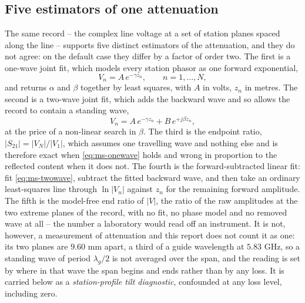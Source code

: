 \subsection{Five estimators of one attenuation}
\label{sec:ms-estimators}

The same record -- the complex line voltage at a set of station planes spaced along the line -- supports five
distinct estimators of the attenuation, and they do not agree: on the default case they differ by a factor of
order two. The first is a one-wave joint fit, which models every station phasor as one forward exponential,
\begin{equation}
  V_n = A\,e^{-\gamma z_n}, \qquad n = 1,\dots,N,
  \label{eq:ms-onewave}
\end{equation}
and returns $\alpha$ and $\beta$ together by least squares, with $A$ in volts, $z_n$ in metres. The second is
a two-wave joint fit, which adds the backward wave and so allows the record to contain a standing wave,
\begin{equation}
  V_n = A\,e^{-\gamma z_n} + B\,e^{+j\beta z_n},
  \label{eq:ms-twowave}
\end{equation}
at the price of a non-linear search in $\beta$. The third is the endpoint ratio, $|S_{21}| = |V_N|/|V_1|$,
which assumes one travelling wave and nothing else and is therefore exact when \eqref{eq:ms-onewave} holds and
wrong in proportion to the reflected content when it does not. The fourth is the forward-subtracted linear
fit: fit \eqref{eq:ms-twowave}, subtract the fitted backward wave, and then take an ordinary least-squares line
through $\ln|V_n|$ against $z_n$ for the remaining forward amplitude. The fifth is the model-free end ratio of
$|V|$, the ratio of the raw amplitudes at the two extreme planes of the record, with no fit, no phase model and
no removed wave at all -- the number a laboratory would read off an instrument. It is not, however, a measurement
of attenuation and this report does not count it as one: its two planes are $9.60$ mm apart, a third of a guide
wavelength at $5.83$ GHz, so a standing wave of period $\lambda_g/2$ is not averaged over the span, and the reading
is set by where in that wave the span begins and ends rather than by any loss. It is carried below as a
\emph{station-profile tilt diagnostic}, confounded at any loss level, including zero.

